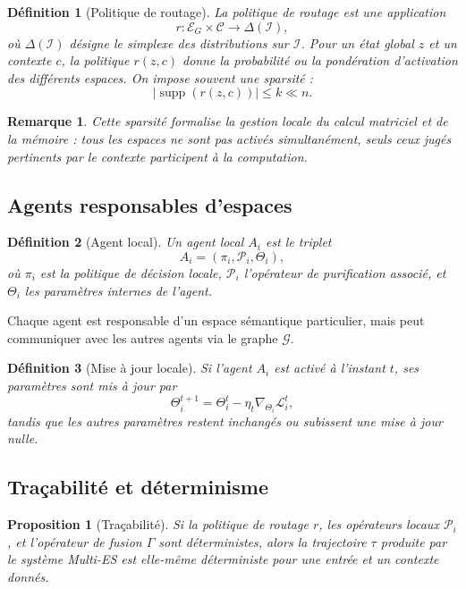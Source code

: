\documentclass[11pt,a4paper]{article}
\newtheorem{definition}{Définition}[section]
\newtheorem{proposition}{Proposition}[section]
\newtheorem{remark}{Remarque}[section]
\DeclareMathOperator{\supp}{supp}
\newcommand{\C}{\mathcal C}
\newcommand{\E}{\mathcal E}
\newcommand{\I}{\mathcal I}
\newcommand{\Pcal}{\mathcal P}
\newcommand{\Gcal}{\mathcal G}
\newcommand{\1}{\mathbf 1}
\begin{document}
\begin{definition}[Politique de routage]
La politique de routage est une application
\[
r:\E_G\times\C \to \Delta(\I),
\]
où \(\Delta(\I)\) désigne le simplexe des distributions sur \(\I\).
Pour un état global \(z\) et un contexte \(c\), la politique \(r(z,c)\) donne la probabilité ou la pondération d'activation des différents espaces.
On impose souvent une sparsité :
\[
|\supp(r(z,c))|\le k \ll n.
\]
\end{definition}

\begin{remark}
Cette sparsité formalise la gestion locale du calcul matriciel et de la mémoire : tous les espaces ne sont pas activés simultanément, seuls ceux jugés pertinents par le contexte participent à la computation.
\end{remark}

\subsection{Agents responsables d'espaces}

\begin{definition}[Agent local]
Un agent local \(A_i\) est le triplet
\[
A_i = (\pi_i,\Pcal_i,\Theta_i),
\]
où \(\pi_i\) est la politique de décision locale, \(\Pcal_i\) l'opérateur de purification associé, et \(\Theta_i\) les paramètres internes de l'agent.
\end{definition}

Chaque agent est responsable d'un espace sémantique particulier, mais peut communiquer avec les autres agents via le graphe \(\Gcal\).

\begin{definition}[Mise à jour locale]
Si l'agent \(A_i\) est activé à l'instant \(t\), ses paramètres sont mis à jour par
\[
\Theta_i^{t+1}
=
\Theta_i^t
-
\eta_t \nabla_{\Theta_i}\mathcal L_i^t,
\]
tandis que les autres paramètres restent inchangés ou subissent une mise à jour nulle.
\end{definition}

\subsection{Traçabilité et déterminisme}

\begin{proposition}[Traçabilité]
Si la politique de routage \(r\), les opérateurs locaux \(\Pcal_i\), et l'opérateur de fusion \(\Gamma\) sont déterministes, alors la trajectoire \(\tau\) produite par le système Multi-ES est elle-même déterministe pour une entrée et un contexte donnés.
\end{proposition}
\end{document}
